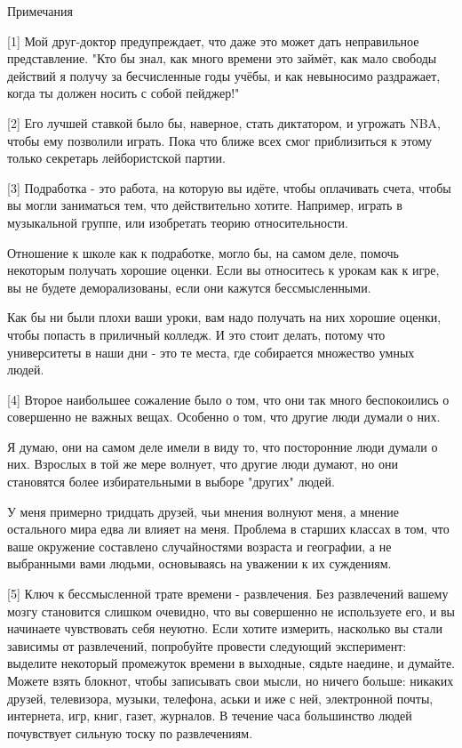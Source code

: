 \documentclass[ebook,12pt,oneside,openany]{memoir}
\begin{document}
Примечания

[1] Мой друг-доктор предупреждает, что даже это может дать
неправильное представление. "Кто бы знал, как много времени это
займёт, как мало свободы действий я получу за бесчисленные годы учёбы,
и как невыносимо раздражает, когда ты должен носить с собой пейджер!"

[2] Его лучшей ставкой было бы, наверное, стать диктатором, и угрожать
NBA, чтобы ему позволили играть. Пока что ближе всех смог приблизиться
к этому только секретарь лейбористской партии.

[3] Подработка - это работа, на которую вы идёте, чтобы оплачивать
счета, чтобы вы могли заниматься тем, что действительно хотите.
Например, играть в музыкальной группе, или изобретать теорию
относительности.

Отношение к школе как к подработке, могло бы, на самом деле, помочь
некоторым получать хорошие оценки. Если вы относитесь к урокам как к
игре, вы не будете деморализованы, если они кажутся бессмысленными.

Как бы ни были плохи ваши уроки, вам надо получать на них хорошие
оценки, чтобы попасть в приличный колледж. И это стоит делать, потому
что университеты в наши дни - это те места, где собирается множество
умных людей.

[4] Второе наибольшее сожаление было о том, что они так много
беспокоились о совершенно не важных вещах. Особенно о том, что другие
люди думали о них.

Я думаю, они на самом деле имели в виду то, что посторонние люди
думали о них. Взрослых в той же мере волнует, что другие люди думают,
но они становятся более избирательными в выборе "других" людей.

У меня примерно тридцать друзей, чьи мнения волнуют меня, а мнение
остального мира едва ли влияет на меня. Проблема в старших классах в
том, что ваше окружение составлено случайностями возраста и географии,
а не выбранными вами людьми, основываясь на уважении к их суждениям.

[5] Ключ к бессмысленной трате времени - развлечения. Без развлечений
вашему мозгу становится слишком очевидно, что вы совершенно не
используете его, и вы начинаете чувствовать себя неуютно. Если хотите
измерить, насколько вы стали зависимы от развлечений, попробуйте
провести следующий эксперимент: выделите некоторый промежуток времени
в выходные, сядьте наедине, и думайте. Можете взять блокнот, чтобы
записывать свои мысли, но ничего больше: никаких друзей, телевизора,
музыки, телефона, аськи и иже с ней, электронной почты, интернета,
игр, книг, газет, журналов. В течение часа большинство людей
почувствует сильную тоску по развлечениям.
\end{document}
